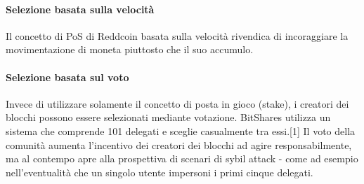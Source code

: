 \paragraph{Selezione basata sulla velocità}
Il concetto di PoS di Reddcoin basata sulla velocità rivendica di incoraggiare la movimentazione di moneta piuttosto che il suo accumulo.

\paragraph{Selezione basata sul voto}
Invece di utilizzare solamente il concetto di posta in gioco (stake), i creatori dei blocchi possono essere selezionati mediante votazione. BitShares utilizza un sistema che comprende 101 delegati e sceglie casualmente tra essi.[1] Il voto della comunità aumenta l'incentivo dei creatori dei blocchi ad agire responsabilmente, ma al contempo apre alla prospettiva di scenari di sybil attack - come ad esempio nell'eventualità che un singolo utente impersoni i primi cinque delegati.

